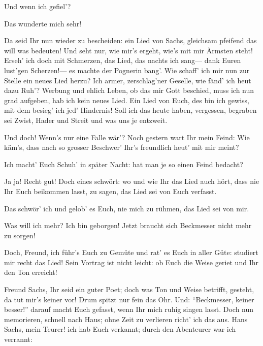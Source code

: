 \begin{drama}
\Beckmesserspeaks
Und wenn ich gefiel'?

\Sachsspeaks
Das wunderte mich sehr!

\Beckmesserspeaks


Da seid Ihr nun wieder zu bescheiden:
ein Lied von Sachs,
gleichsam pfeifend
das will was bedeuten!
Und seht nur, wie mir's ergeht,
wie's mit mir Ärmsten steht!
Erseh' ich doch mit Schmerzen,
das Lied, das nachts ich sang---
dank Euren lust'gen Scherzen!---
es machte der Pognerin bang'.
Wie schaff' ich mir nun zur Stelle
ein neues Lied herzu?
Ich armer, zerschlag'ner Geselle,
wie fänd' ich heut dazu Ruh'?
Werbung und ehlich Leben,
ob das mir Gott beschied,
muss ich nun grad aufgeben,
hab ich kein neues Lied.
Ein Lied von Euch, des bin ich gewiss,
mit dem besieg' ich jed' Hindernis!
Soll ich das heute haben,
vergessen, begraben
sei Zwist, Hader und Streit
und was uns je entzweit.


Und doch! Wenn's nur eine Falle wär'?
Noch gestern wart Ihr mein Feind:
Wie käm's, dass nach so grosser Beschwer'
Ihr's freundlich heut' mit mir meint?

\Sachsspeaks
Ich macht' Euch Schuh' in später Nacht:
hat man je so einen Feind bedacht?

\Beckmesserspeaks
Ja ja! Recht gut! Doch eines schwört:
wo und wie Ihr das Lied auch hört,
dass nie Ihr Euch beikommen lasst,
zu sagen, das Lied sei von Euch verfasst.

\Sachsspeaks
Das schwör' ich und gelob' es Euch,
nie mich zu rühmen, das Lied sei von mir.

\Beckmesserspeaks


Was will ich mehr? Ich bin geborgen!
Jetzt braucht sich Beckmesser nicht mehr zu sorgen!

\Sachsspeaks
Doch, Freund, ich führ's Euch zu Gemüte
und rat' es Euch in aller Güte:
studiert mir recht das Lied!
Sein Vortrag ist nicht leicht:
ob Euch die Weise geriet
und Ihr den Ton erreicht!

\Beckmesserspeaks
Freund Sachs, Ihr seid ein guter Poet;
doch was Ton und Weise betrifft,
gesteht, da tut mir's keiner vor!
Drum spitzt nur fein das Ohr.
Und:
``Beckmesser, keiner besser!''
darauf macht Euch gefasst,
wenn Ihr mich ruhig singen lasst.
Doch nun memorieren,
schnell nach Haus;
ohne Zeit zu verlieren
richt' ich das aus.
Hans Sachs, mein Teurer!
ich hab Euch verkannt;
durch den Abenteurer
war ich verrannt:


\end{drama}
